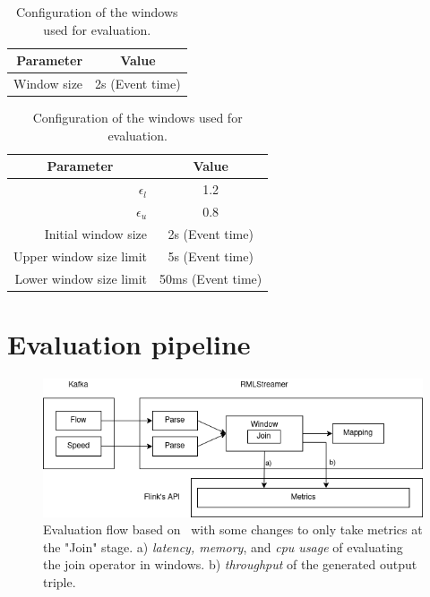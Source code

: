 \begin{table}[htbp]
    \centering
    \begin{subtable}{\textwidth}
        \centering
        \begin{tabular}{|r|c|}
        \hline
        Parameter   & Value           \\ \hline
        Window size & 2s (Event time) \\ \hline
        \end{tabular}
        \caption{Tumbling Window's configuration }
        \label{tab:tumbling_config}
    \end{subtable}


    \begin{subtable}{\textwidth}
        \centering
        \begin{tabular}{|r|c|}
        \hline
        \multicolumn{1}{|c|}{Parameter}               & Value             \\ \hline
        $\epsilon_l$            & 1.2               \\ \hline
        $\epsilon_u$            & 0.8               \\ \hline
        Initial window size     & 2s (Event time)   \\ \hline
        Upper window size limit & 5s (Event time)   \\ \hline
        Lower window size limit & 50ms (Event time) \\ \hline
        \end{tabular}
        \caption{Dynamic Window's configuration}
        \label{tab:dynamic_config}
    \end{subtable}

    \caption{Configuration of the windows used for evaluation.}
    \label{tab:window_configuration}

\end{table}
\newpage

\section{Evaluation pipeline}
\begin{figure}[!htbp]
    \centering
    \includegraphics[width=\textwidth]{fig/evaluation_architecture.png}
    \caption[Evaluation flow based on~\cite{evalution_of_spe} with some changes to only 
    take metrics at the "Join" stage.]
    {Evaluation flow based on~\cite{evalution_of_spe} with some changes to only 
    take metrics at the "Join" stage.
    a) \emph{latency, memory}, and \emph{cpu usage} of evaluating the join operator in windows.
    b) \emph{throughput} of the generated output triple.}
    \label{fig:evaluation_flow}
    
\end{figure}

